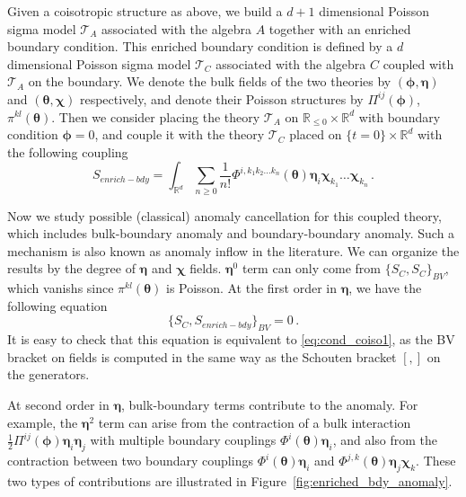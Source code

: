 \documentclass[11pt]{article}
\newcommand{\R}{\mathbb{R}}
\numberwithin{equation}{section}
\begin{document}
Given a coisotropic structure as above, we build a $d+1$ dimensional Poisson sigma model $\mathcal{T}_A$ associated with the algebra $A$ together with an enriched boundary condition. This enriched boundary condition is defined by a $d$ dimensional Poisson sigma model $\mathcal{T}_C$ associated with the algebra $C$ coupled with $\mathcal{T}_A$ on the boundary. We denote the bulk fields of the two theories by $(\boldsymbol{\phi},\boldsymbol{\eta})$ and $(\boldsymbol{\theta}, \boldsymbol{\chi})$ respectively, and denote their Poisson structures by $\Pi^{ij}(\boldsymbol{\phi})$, $\pi^{kl}(\boldsymbol{\theta})$. Then we consider placing the theory $\mathcal{T}_A$ on $\R_{\leq 0}\times \R^d  $ with boundary condition $\boldsymbol{\phi} = 0$, and couple it with the theory $\mathcal{T}_C$ placed on $\{t=0\}\times\R^d $ with the following coupling
\begin{equation}
S_{enrich-bdy} = \int_{\R^d} \sum_{n\geq 0}\frac{1}{n!}\Phi^{i,k_1k_2\dots k_{n}}(\boldsymbol{\theta})\boldsymbol{\eta}_i \boldsymbol{\chi}_{k_1}\dots \boldsymbol{\chi}_{k_n}\,.
\end{equation}

Now we study possible (classical) anomaly cancellation for this coupled theory, which includes bulk-boundary anomaly and boundary-boundary anomaly. Such a mechanism is also known as anomaly inflow in the literature. We can organize the results by the degree of $\boldsymbol{\eta}$ and $\boldsymbol{\chi}$ fields. $\boldsymbol{\eta}^0$ term can only come from $\{S_C,S_C\}_{BV}$, which vanishs since $\pi^{kl}(\boldsymbol{\theta})$ is Poisson. At the first order in $\boldsymbol{\eta}$, we have the following equation
\begin{equation}
	\{S_C,S_{enrich-bdy}\}_{BV} = 0\,.
\end{equation}
It is easy to check that this equation is equivalent to \eqref{eq:cond_coiso1}, as the BV bracket on fields is computed in the same way as the Schouten bracket $[,]$ on the generators. 

At second order in $\boldsymbol{\eta}$, bulk-boundary terms contribute to the anomaly. For example, the $\boldsymbol{\eta}^2$ term can arise from the contraction of a bulk interaction $\frac{1}{2}\Pi^{ij}(\boldsymbol{\phi})\boldsymbol{\eta}_i\boldsymbol{\eta}_j$ with multiple boundary couplings $\Phi^i(\boldsymbol{\theta})\boldsymbol{\eta}_i$, and also from the contraction between two boundary couplings $\Phi^i(\boldsymbol{\theta})\boldsymbol{\eta}_i$ and $\Phi^{j,k}(\boldsymbol{\theta})\boldsymbol{\eta}_j\boldsymbol{\chi}_k$. These two types of contributions are illustrated in Figure~\ref{fig:enriched_bdy_anomaly}.
\end{document}
